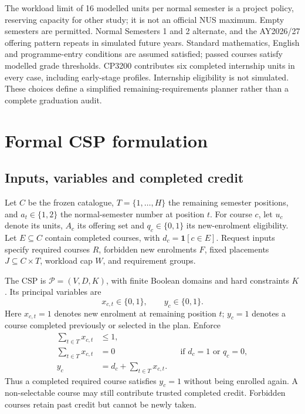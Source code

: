 \documentclass[11pt,a4paper]{article}
\begin{document}
The workload limit of 16 modelled units per normal semester is a project
policy, reserving capacity for other study; it is not an official NUS maximum.
Empty semesters are permitted. Normal Semesters 1 and 2 alternate, and the
AY2026/27 offering pattern repeats in simulated future years. Standard
mathematics, English and programme-entry conditions are assumed satisfied;
passed courses satisfy modelled grade thresholds. CP3200 contributes six
completed internship units in every case, including early-stage profiles.
Internship eligibility is not simulated. These choices define a simplified
remaining-requirements planner rather than a complete graduation audit.

\par
\section{Formal CSP formulation}
\subsection{Inputs, variables and completed credit}
Let $C$ be the frozen catalogue, $T=\{1,\ldots,H\}$ the remaining semester
positions, and $a_t\in\{1,2\}$ the normal-semester number at position $t$.
For course $c$, let $u_c$ denote its units, $A_c$ its offering set and
$q_c\in\{0,1\}$ its new-enrolment eligibility. Let $E\subseteq C$ contain
completed courses, with $d_c=\mathbf{1}[c\in E]$. Request inputs specify
required courses $R$, forbidden new enrolments $F$, fixed placements
$J\subseteq C\times T$, workload cap $W$, and requirement groups.

The CSP is $\mathcal{P}=(V,D,K)$, with finite Boolean domains and hard
constraints $K$. Its principal variables are
\[
 x_{c,t}\in\{0,1\},\qquad y_c\in\{0,1\}.
\]
Here $x_{c,t}=1$ denotes new enrolment at remaining position $t$; $y_c=1$
denotes a course completed previously or selected in the plan. Enforce
\begin{align}
 \sum_{t\in T}x_{c,t}&\leq 1, \label{eq:once}\\
 \sum_{t\in T}x_{c,t}&=0
       &&\text{if }d_c=1\text{ or }q_c=0, \label{eq:elig}\\
 y_c&=d_c+\sum_{t\in T}x_{c,t}. \label{eq:link}
\end{align}
Thus a completed required course satisfies $y_c=1$ without being enrolled
again. A non-selectable course may still contribute trusted completed credit.
Forbidden courses retain past credit but cannot be newly taken.
\end{document}
